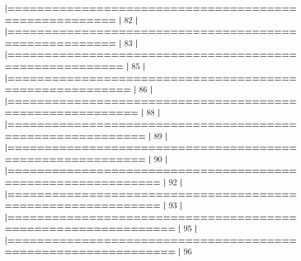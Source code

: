 \documentclass[]{book}
\newenvironment{Shaded}{\begin{snugshade}}{\end{snugshade}}
\newcommand{\DecValTok}[1]{\textcolor[rgb]{0.00,0.00,0.81}{#1}}
\newcommand{\ErrorTok}[1]{\textcolor[rgb]{0.64,0.00,0.00}{\textbf{#1}}}
\newcommand{\NormalTok}[1]{#1}
\newcommand{\OperatorTok}[1]{\textcolor[rgb]{0.81,0.36,0.00}{\textbf{#1}}}
\newcommand{\StringTok}[1]{\textcolor[rgb]{0.31,0.60,0.02}{#1}}
\begin{document}
\begin{Shaded}
\begin{Highlighting}[]
{{{{{{{{{{{{{{{{{{{{{{{{{{{{{{{{{{{{{{{{{{{{{{{{{{{{{{{{{{{{\StringTok{  }\ErrorTok{|======================================================}\StringTok{           }\ErrorTok{|}\StringTok{  }\DecValTok{82}\NormalTok{%}
  \OperatorTok{|}\StringTok{                                                                       }
\StringTok{  }\ErrorTok{|======================================================}\StringTok{           }\ErrorTok{|}\StringTok{  }\DecValTok{83}\NormalTok{%}
  \OperatorTok{|}\StringTok{                                                                       }
\StringTok{  }\ErrorTok{|=======================================================}\StringTok{          }\ErrorTok{|}\StringTok{  }\DecValTok{85}\NormalTok{%}
  \OperatorTok{|}\StringTok{                                                                       }
\StringTok{  }\ErrorTok{|========================================================}\StringTok{         }\ErrorTok{|}\StringTok{  }\DecValTok{86}\NormalTok{%}
  \OperatorTok{|}\StringTok{                                                                       }
\StringTok{  }\ErrorTok{|=========================================================}\StringTok{        }\ErrorTok{|}\StringTok{  }\DecValTok{88}\NormalTok{%}
  \OperatorTok{|}\StringTok{                                                                       }
\StringTok{  }\ErrorTok{|==========================================================}\StringTok{       }\ErrorTok{|}\StringTok{  }\DecValTok{89}\NormalTok{%}
  \OperatorTok{|}\StringTok{                                                                       }
\StringTok{  }\ErrorTok{|==========================================================}\StringTok{       }\ErrorTok{|}\StringTok{  }\DecValTok{90}\NormalTok{%}
  \OperatorTok{|}\StringTok{                                                                       }
\StringTok{  }\ErrorTok{|============================================================}\StringTok{     }\ErrorTok{|}\StringTok{  }\DecValTok{92}\NormalTok{%}
  \OperatorTok{|}\StringTok{                                                                       }
\StringTok{  }\ErrorTok{|============================================================}\StringTok{     }\ErrorTok{|}\StringTok{  }\DecValTok{93}\NormalTok{%}
  \OperatorTok{|}\StringTok{                                                                       }
\StringTok{  }\ErrorTok{|==============================================================}\StringTok{   }\ErrorTok{|}\StringTok{  }\DecValTok{95}\NormalTok{%}
  \OperatorTok{|}\StringTok{                                                                       }
\StringTok{  }\ErrorTok{|==============================================================}\StringTok{   }\ErrorTok{|}\StringTok{  }\DecValTok{96}\NormalTok{%}
}}}}}}}}}}}}}}}}}}}}}}}}}}}}}}}}}}}}}}}}}}}}}}}}}}}}}}}}}}}}}}}}}}}}}}}
\end{Highlighting}
\end{Shaded}
\end{document}
